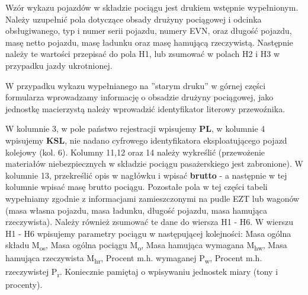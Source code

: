 Wzór wykazu pojazdów w składzie pociągu jest drukiem wstępnie wypełnionym. Należy uzupełnić pola dotyczące obsady drużyny pociągowej i odcinka obsługiwanego, typ i numer serii pojazdu, numery EVN, oraz długość pojazdu, masę netto pojazdu, masę ładunku oraz masę hamującą rzeczywistą. Następnie należy te wartości przepisać do pola H1, lub zsumować w polach H2 i H3 w przypadku jazdy ukrotnionej.

W przypadku wykazu wypełnianego na ''starym druku'' w górnej części formularza wprowadzamy informację o obsadzie drużyny pociągowej, jako jednostkę macierzystą należy wprowadzić identyfikator literowy przewoźnika.

W kolumnie 3, w pole państwo rejestracji wpisujemy \textbf{PL}, w kolumnie 4 wpisujemy \textbf{KSL}, nie nadano cyfrowego identyfikatora eksploatującego pojazd kolejowy (kol. 6). Kolumny 11,12 oraz 14 należy wykreślić (przewożenie materiałów niebezpiecznych w składzie pociągu pasażerskiego jest zabronione). W kolumnie 13, przekreślić opis w nagłówku i wpisać \textbf{brutto} - a następnie w tej kolumnie wpisać masę brutto pociągu. Pozostałe pola w tej części tabeli wypełniamy zgodnie z informacjami zamieszczonymi na pudle EZT lub wagonów (masa własna pojazdu, masa ładunku, długość pojazdu, masa hamująca rzeczywista). Należy również zsumować te dane do wiersza H1 - H6.
W wierszu H1 - H6 wpisujemy parametry pociągu w następującej kolejności: Masa ogólna składu M\textsubscript{os}, Masa ogólna pociągu M\textsubscript{o}, Masa hamująca wymagana M\textsubscript{hw}, Masa hamująca rzeczywista M\textsubscript{hr}, Procent m.h. wymaganej P\textsubscript{w}, Procent m.h. rzeczywistej P\textsubscript{r}. Koniecznie pamiętaj o wpisywaniu jednostek miary (tony i procenty).


